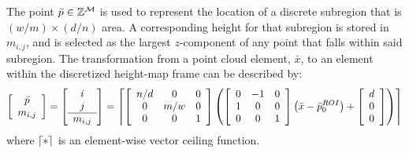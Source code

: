 			The point $\bar{p}\in{\Bbb Z}^{{\cal M}}$ is used to represent the location of a discrete subregion that is $(w/m) \times (d/n)$ area. A corresponding height for that subregion is stored in $m_{i,j}$, and is selected as the largest $z$-component of any point that falls within said subregion. The transformation from a point cloud element, $\bar{x}$, to an element within the discretized height-map frame can be described by:
				\begin{equation}
					\left[
						\begin{array}{c}
						\bar{p} \\
						m_{i,j}  	\\
						\end{array}
					\right]
					=
					\left[
						\begin{array}{c}
						i \\
						j \\ \hline
						m_{i,j}  	\\
						\end{array}
					\right]
					=
					\left\lceil
						\left[
							\begin{array}{ccc}
							n/d & 0 	& 0 \\
							0 	& m/w 	& 0 \\
							0 	& 0 	& 1 \\
							\end{array}
						\right]
						\left(
							\left[
								\begin{array}{ccc}
								0 &-1 & 0 \\
								1 & 0 & 0 \\
								0 & 0 & 1 \\
								\end{array}
							\right]
							\left(\bar{x}-\bar{p}_{0}^{ROI}\right)
							+
							\left[
								\begin{array}{c}
								d \\
								0 \\
								0 \\
								\end{array}
							\right]
						\right)
					\right\rceil
					\label{eq::toheightmapframe}
				\end{equation}
			where $\left\lceil*\right\rceil$ is an element-wise vector ceiling function.


